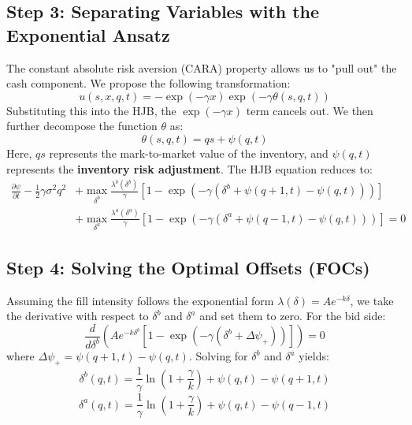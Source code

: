 \subsection{Step 3: Separating Variables with the Exponential Ansatz}
The constant absolute risk aversion (CARA) property allows us to "pull out" the cash component. We propose the following transformation:
\begin{equation}
    u(s, x, q, t) = -\exp(-\gamma x) \exp(-\gamma \theta(s, q, t))
\end{equation}
Substituting this into the HJB, the $\exp(-\gamma x)$ term cancels out. We then further decompose the function $\theta$ as:
\begin{equation}
    \theta(s, q, t) = q s + \psi(q, t)
\end{equation}
Here, $qs$ represents the mark-to-market value of the inventory, and $\psi(q, t)$ represents the \textbf{inventory risk adjustment}. The HJB equation reduces to:
\begin{equation}
\begin{aligned}
    \frac{\partial \psi}{\partial t} - \frac{1}{2} \gamma \sigma^2 q^2 &+ \max_{\delta^b} \frac{\lambda^b(\delta^b)}{\gamma} [1 - \exp(-\gamma (\delta^b + \psi(q+1, t) - \psi(q, t)))] \\
    &+ \max_{\delta^a} \frac{\lambda^a(\delta^a)}{\gamma} [1 - \exp(-\gamma (\delta^a + \psi(q-1, t) - \psi(q, t)))] = 0
\end{aligned}
\end{equation}

\subsection{Step 4: Solving the Optimal Offsets (FOCs)}
Assuming the fill intensity follows the exponential form $\lambda(\delta) = A e^{-k\delta}$, we take the derivative with respect to $\delta^b$ and $\delta^a$ and set them to zero. For the bid side:
\begin{equation}
    \frac{d}{d \delta^b} \left( A e^{-k \delta^b} [1 - \exp(-\gamma (\delta^b + \Delta \psi_+))] \right) = 0
\end{equation}
where $\Delta \psi_+ = \psi(q+1, t) - \psi(q, t)$. Solving for $\delta^b$ and $\delta^a$ yields:
\begin{equation}
    \delta^b(q, t) = \frac{1}{\gamma} \ln \left( 1 + \frac{\gamma}{k} \right) + \psi(q, t) - \psi(q+1, t)
\end{equation}
\begin{equation}
    \delta^a(q, t) = \frac{1}{\gamma} \ln \left( 1 + \frac{\gamma}{k} \right) + \psi(q, t) - \psi(q-1, t)
\end{equation}

